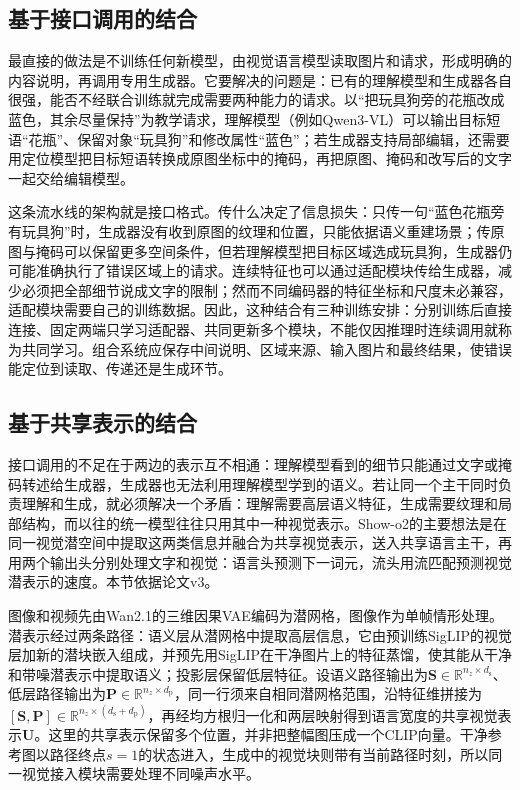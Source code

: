 \subsection{基于接口调用的结合}
\label{sec:vision-models-composition}

最直接的做法是不训练任何新模型，由视觉语言模型读取图片和请求，形成明确的内容说明，再调用专用生成器。它要解决的问题是：已有的理解模型和生成器各自很强，能否不经联合训练就完成需要两种能力的请求。以“把玩具狗旁的花瓶改成蓝色，其余尽量保持”为教学请求，理解模型（例如Qwen3-VL）可以输出目标短语“花瓶”、保留对象“玩具狗”和修改属性“蓝色”；若生成器支持局部编辑，还需要用定位模型把目标短语转换成原图坐标中的掩码，再把原图、掩码和改写后的文字一起交给编辑模型。

这条流水线的架构就是接口格式。传什么决定了信息损失：只传一句“蓝色花瓶旁有玩具狗”时，生成器没有收到原图的纹理和位置，只能依据语义重建场景；传原图与掩码可以保留更多空间条件，但若理解模型把目标区域选成玩具狗，生成器仍可能准确执行了错误区域上的请求。连续特征也可以通过适配模块传给生成器，减少必须把全部细节说成文字的限制；然而不同编码器的特征坐标和尺度未必兼容，适配模块需要自己的训练数据。因此，这种结合有三种训练安排：分别训练后直接连接、固定两端只学习适配器、共同更新多个模块，不能仅因推理时连续调用就称为共同学习。组合系统应保存中间说明、区域来源、输入图片和最终结果，使错误能定位到读取、传递还是生成环节。

\subsection{基于共享表示的结合}
\label{sec:vision-models-showo2}

接口调用的不足在于两边的表示互不相通：理解模型看到的细节只能通过文字或掩码转述给生成器，生成器也无法利用理解模型学到的语义。若让同一个主干同时负责理解和生成，就必须解决一个矛盾：理解需要高层语义特征，生成需要纹理和局部结构，而以往的统一模型往往只用其中一种视觉表示。Show-o2的主要想法是在同一视觉潜空间中提取这两类信息并融合为共享视觉表示，送入共享语言主干，再用两个输出头分别处理文字和视觉：语言头预测下一词元，流头用流匹配预测视觉潜表示的速度。本节依据论文v3。

图像和视频先由Wan2.1的三维因果VAE编码为潜网格，图像作为单帧情形处理。潜表示经过两条路径：语义层从潜网格中提取高层信息，它由预训练SigLIP的视觉层加新的潜块嵌入组成，并预先用SigLIP在干净图片上的特征蒸馏，使其能从干净和带噪潜表示中提取语义；投影层保留低层特征。设语义路径输出为$\bm S\in\mathbb R^{n_z\times d_{\mathrm s}}$、低层路径输出为$\bm P\in\mathbb R^{n_z\times d_{\mathrm p}}$，同一行须来自相同潜网格范围，沿特征维拼接为$[\bm S,\bm P]\in\mathbb R^{n_z\times(d_{\mathrm s}+d_{\mathrm p})}$，再经均方根归一化和两层映射得到语言宽度的共享视觉表示$\bm U$。这里的共享表示保留多个位置，并非把整幅图压成一个CLIP向量。干净参考图以路径终点$s=1$的状态进入，生成中的视觉块则带有当前路径时刻，所以同一视觉接入模块需要处理不同噪声水平。

